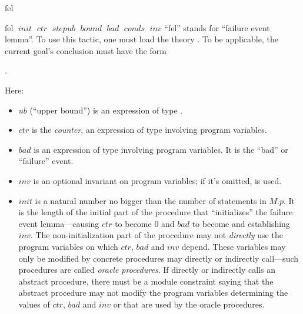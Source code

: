 \begin{tactic}{fel}
  \begin{tsyntax}{fel $\;\mathit{init}$ $\;\mathit{ctr}$ $\;\mathit{stepub}$
                      $\;\mathit{bound}$ $\;\mathit{bad}$ $\;\mathit{conds}$
                      $\;\mathit{inv}$}
    ``fel'' stands for ``failure event lemma''. To use this tactic,
    one must load the theory . To be applicable, the
    current goal's conclusion must have the form
    \begin{center}
      .
    \end{center}
    Here:
    \begin{itemize}
    \item $\mathit{ub}$ (``upper bound'') is an expression of type .

    \item $\mathit{ctr}$ is the \emph{counter}, an expression of
      type  involving program variables.

    \item $\mathit{bad}$ is an expression of type  involving
      program variables. It is the ``bad'' or ``failure'' event.

    \item $\mathit{inv}$ is an optional invariant on program
      variables; if it's omitted,  is used.

    \item $\mathit{init}$ is a natural number no bigger than the
      number of statements in $M$.$p$. It is the length of the initial
      part of the procedure that ``initializes'' the failure event
      lemma---causing $\mathit{ctr}$ to become $0$ and $\mathit{bad}$
      to become  and establishing $\mathit{inv}$.  The
      non-initialization part of the procedure may not \emph{directly}
      use the program variables on which $\mathit{ctr}$,
      $\mathit{bad}$ and $\mathit{inv}$ depend. These variables may
      only be modified by concrete procedures  may
      directly or indirectly call---such procedures are called
      \emph{oracle procedures}.  If  directly or
      indirectly calls an abstract procedure, there must be a module
      constraint saying that the abstract procedure may not modify the
      program variables determining the values of $\mathit{ctr}$,
      $\mathit{bad}$ and $\mathit{inv}$ or that are used by the oracle
      procedures.


\end{itemize}
\end{tsyntax}
\end{tactic}

